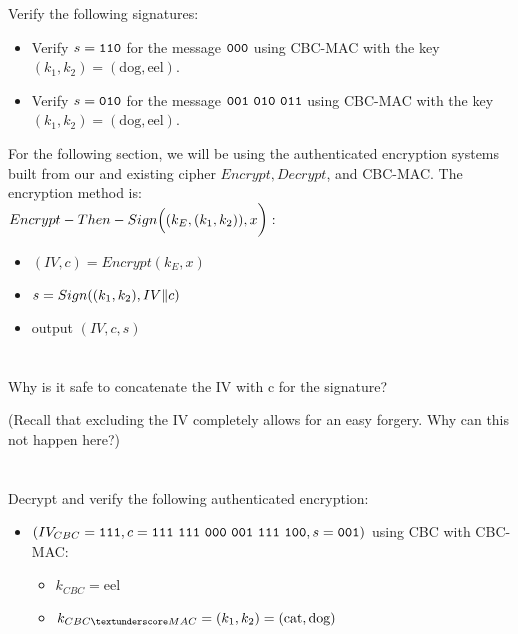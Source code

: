 \documentclass[12pt]{article}
\begin{document}
Verify the following signatures:

\begin{itemize}
\item Verify $s = {\tt 110}$ for the message ${\tt 000}$ using CBC-MAC with the key $(k_1, k_2) = (\text{dog}, \text{eel})$.
\item Verify $s = {\tt 010}$ for the message ${\tt 001~010~011}$ using CBC-MAC with the key $(k_1, k_2) = (\text{dog}, \text{eel})$.
\end{itemize}

\newpage
For the following section, we will be using the authenticated encryption systems built from our and existing cipher $Encrypt, Decrypt$, and CBC-MAC. The encryption method is:\\

$Encrypt-Then-Sign\Big(\large(k_E, (k_1, k_2)\large), x\Big):$

\begin{itemize}
\item $(IV, c) = Encrypt(k_E, x)$
\item $s = Sign\Large((k_1, k_2), IV \| c\Large)$
\item output $(IV, c, s)$
\end{itemize}

\section{}

Why is it safe to concatenate the IV with c for the signature?

(Recall that excluding the IV completely allows for an easy forgery. Why can this not happen here?)

\section{}

Decrypt and verify the following authenticated encryption:

\begin{itemize}
\item $(IV_{CBC} = {\tt 111}, c = {\tt 111~111~000~001~111~100}, s = {\tt 001})$ using CBC with CBC-MAC:
\begin{itemize}
\item $k_{CBC} = \text{eel}$
\item $k_{CBC{\textunderscore}MAC} = (k_1, k_2) = (\text{cat}, \text{dog})$ \\
\end{itemize}
\end{itemize}
\end{document}

